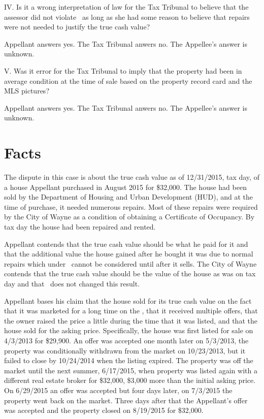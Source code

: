 \documentclass[12pt,\documentclassflag]{michiganCourtOfAppealsBrief}
\def\mathieuGast{\pincite[l]{MCL}{211.27(2)}}
\begin{document}
\noindent IV. Is it a wrong interpretation of law for the Tax Tribunal to believe that the assessor did not violate \mathieuGast\ as long as she had some reason to believe that repairs were not needed to justify the true cash value?

Appellant answers yes. The Tax Tribunal anwers no. The Appellee's answer is unknown. 
\vspace{\baselineskip}

\noindent V. Was it error for the Tax Tribunal to imply that the property had been in average condition at the time of sale based on the property record card and the MLS pictures?

Appellant answers yes. The Tax Tribunal anwers no. The Appellee's answer is unknown. 
\vspace{\baselineskip}

\section{Facts}
The dispute in this case is about the true cash value as of 12/31/2015, tax day, of a house Appellant purchased in August 2015 for \$32,000. The house had been sold by the Department of Housing and Urban Development (HUD), and at the time of purchase, it needed numerous repairs. Most of these repairs were required by the City of Wayne as a condition of obtaining a Certificate of Occupancy. By tax day the house had been repaired and rented.

Appellant contends that the true cash value should be what he paid for it and that the additional value the house gained after he bought it was due to normal repairs which under \mathieuGast\ cannot be considered until after it sells. The City of Wayne contends that the true cash value should be the value of the house as was on tax day and that \mathieuGast\ does not changed this result.

Appellant bases his claim that the house sold for its true cash value on the fact that it was marketed for a long time on the \MLS, that it received multiple offers, that the owner raised the price a little during the time that it was listed, and that the house sold for the asking price. Specifically, the house was first listed for sale on 4/3/2013 for \$29,900. An offer was accepted one month later on 5/3/2013, the property was conditionally withdrawn from the market on 10/23/2013, but it failed to close by 10/24/2014 when the listing expired. The property was off the market until the next summer, 6/17/2015, when property was listed again with a different real estate broker for \$32,000, \$3,000 more than the initial asking price. On 6/29/2015 an offer was accepted but four days later, on 7/3/2015 the property went back on the market. Three days after that the Appellant's offer was accepted and the property closed on 8/19/2015 for \$32,000.
\end{document}
